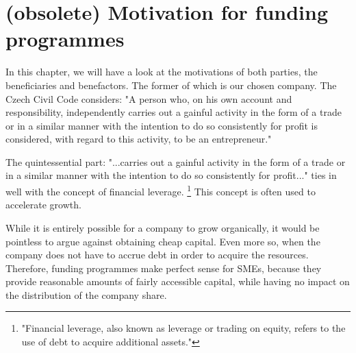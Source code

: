 \documentclass[12pt,oneside]{fithesis2}
\begin{document}
\section{(obsolete) Motivation for funding programmes}\label{motivation}
In this chapter, we will have a look at the motivations of both parties, the beneficiaries and benefactors. The former of which is our chosen company.
The Czech Civil Code considers: "A person who, on his own account and responsibility, independently carries out a gainful activity in the form of a trade or in a similar manner with the intention to do so consistently for profit is considered, with regard to this activity, to be an entrepreneur."\cite{entrepreneur-law}
\par
The quintessential part: "...carries out a gainful activity in the form of a trade or in a similar manner with the intention to do so consistently for profit..."\cite{entrepreneur-law} ties in well with the concept of financial leverage. \footnote{"Financial leverage, also known as leverage or trading on equity, refers to the use of debt to acquire additional assets."\cite{financial-leverage}} This concept is often used to accelerate growth.
\par
While it is entirely possible for a company to grow organically, it would be pointless to argue against obtaining cheap capital. Even more so, when the company does not have to accrue debt in order to acquire the resources. Therefore, funding programmes make perfect sense for SMEs, because they provide reasonable amounts of fairly accessible capital, while having no impact on the distribution of the company share.
\end{document}
